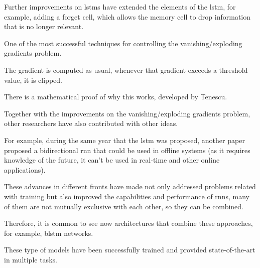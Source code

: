 Further improvements on \glspl{lstm} have extended the
elements of the \gls{lstm}, for example, adding a forget
cell, which allows the memory cell to drop information that
is no longer relevant.

 One of the most successful techniques for
controlling the vanishing/exploding gradients problem.

The gradient is computed as usual, whenever that gradient
exceeds a threshold value, it is clipped.

There is a mathematical proof of why this works, developed
by Tenescu.

 Together with the improvements on
the vanishing/exploding gradients problem, other researchers
have also contributed with other ideas.

For example, during the same year that the \gls{lstm} was
proposed, another paper proposed a bidirectional \gls{rnn}
that could be used in offline systems (as it requires
knowledge of the future, it can’t be used in real-time and
other online applications).

These advances in different fronts have made not only
addressed problems related with training but also improved
the capabilities and performance of \glspl{rnn}, many of
them are not mutually exclusive with each other, so they can
be combined.

Therefore, it is common to see now architectures that
combine these approaches, for example, \gls{blstm} networks.

These type of models have been successfully trained and
provided state-of-the-art in multiple tasks.
